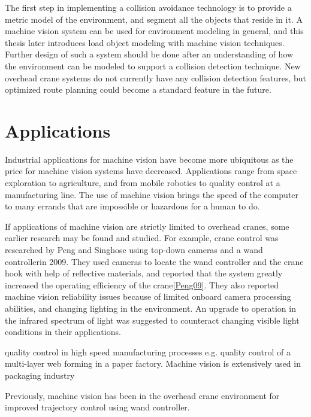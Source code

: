 \documentclass[12pt,a4paper,oneside,pdftex]{report}
\begin{document}
The first step in implementing a collision avoidance technology is to provide a metric model of the environment, and segment all the objects that reside in it. A machine vision system can be used for environment modeling in general, and this thesis later introduces load object modeling with machine vision techniques. Further design of such a system should be done after an understanding of how the environment can be modeled to support a collision detection technique. New overhead crane systems do not currently have any collision detection features, but optimized route planning could become a standard feature in the future.
 
\section{Applications}

Industrial applications for machine vision have become more ubiquitous as the price for machine vision systems have decreased. Applications range from space exploration to agriculture, and from mobile robotics to quality control at a manufacturing line. The use of machine vision brings the speed of the computer to many errands that are impossible or hazardous for a human to do.

If applications of machine vision are strictly limited to overhead cranes, some earlier research may be found and studied. For example, crane control was researched by Peng and Singhose using top-down cameras and a wand controllerin 2009. They used cameras to locate the wand controller and the crane hook with help of reflective materials, and reported that the system greatly increased the operating efficiency of the crane\ref{Peng09}. They also reported machine vision reliability issues because of limited onboard camera processing abilities, and changing lighting in the environment. An upgrade to operation in the infrared spectrum of light was suggested to counteract changing visible light conditions in their applications.


quality control in high speed manufacturing processes e.g. quality control of a multi-layer web forming in a paper factory. Machine vision is extensively used in packaging industry






Previously, machine vision has been  in the overhead crane environment for improved trajectory control using wand controller. 
\end{document}

